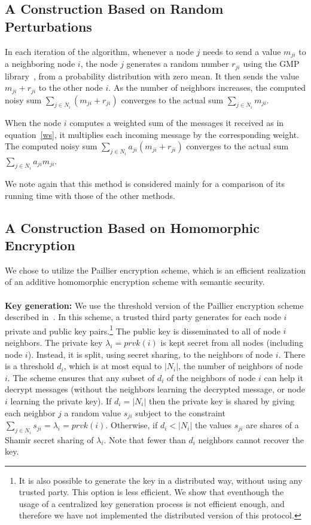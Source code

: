 \documentclass[10pt]{svjour3}
\begin{document}
\subsection{A Construction Based on Random Perturbations}
 In each iteration of the algorithm, whenever a node $j$
needs to send a value $m_{ji}$ to a neighboring node $i$, the node
$j$ generates a random number $r_{ji}$ using the GMP
library~\cite{GMP}, from a probability distribution with zero
mean. It then sends the value $m_{ji}+r_{ji}$ to the other node
$i$.
 As the number of neighbors increases,
the computed noisy sum $\sum_{j\in N_i} (m_{ji}+r_{ji})$ converges
to the actual sum $\sum_{j\in N_i} m_{ji}$.

When the node $i$ computes a weighted sum of the messages it
received as in equation~\ref{ws}, it multiplies each incoming
message by the corresponding weight. The computed noisy sum
$\sum_{j\in N_i} a_{ji}(m_{ji}+r_{ji})$
 converges to the
actual sum  $\sum_{j\in N_i} a_{ji}m_{ji}$.

We note again that this method is considered mainly for a comparison
of its  running
time with those of  the other methods.

\subsection{A Construction Based on Homomorphic Encryption}
\label{Homomorphic}


We chose to utilize the Paillier encryption scheme, which is an
efficient realization of an additive homomorphic encryption scheme
with
semantic security.\\
\\
{\bf Key generation: } We use the threshold version of the
Paillier encryption scheme described in~\cite{Paillier2}. In this
scheme, a trusted third party generates for each node $i$ private
and public key pairs.\footnote{It is also possible to generate the key
  in a distributed way, without using any trusted  party. This option
  is less efficient. We  show that eventhough the usage of a
  centralized key generation process is not efficient enough, and
  therefore we have not implemented the distributed version of this protocol.}
  The public key is disseminated to all of
node $i$ neighbors. The private key $\lambda_i=prvk(i)$ is kept
secret from all nodes (including node $i$). Instead, it is split,
using secret sharing, to the neighbors of node $i$. There is a
threshold $d_i$, which is at most equal to $|N_i|$, the number of
neighbors of node $i$. The scheme ensures that any subset of $d_i$
of the neighbors of node $i$ can help it decrypt messages (without
the neighbors learning the decrypted message, or node $i$ learning
the private key). If $d_i=|N_i|$ then the private key is shared by
giving each neighbor $j$ a random value $s_{ji}$ subject to the
constraint $\sum_{j\in N_i}s_{ji} = \lambda_i=prvk(i)$. Otherwise,
if $d_i<|N_i|$ the values $s_{ji}$ are shares of a Shamir secret
sharing of $\lambda_i$. Note that fewer than $d_i$ neighbors cannot
recover the key.
\end{document}
